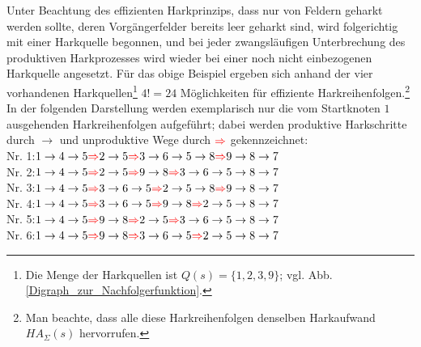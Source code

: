 \documentclass[fontsize=12pt,doubleside,openany,listof=totoc,listof=flat,listof=nochaptergap,numbers=noenddot]{scrbook}
\theoremstyle{style}
\begin{document}
\noindent Unter Beachtung des effizienten Harkprinzips, dass nur von Feldern geharkt werden sollte, deren Vorgängerfelder bereits leer geharkt sind, wird folgerichtig mit einer Harkquelle begonnen, und bei jeder zwangsläufigen Unterbrechung des produktiven Harkprozesses wird wieder bei einer noch nicht einbezogenen Harkquelle angesetzt. Für das obige Beispiel ergeben sich anhand der vier vorhandenen Harkquellen\footnote{Die Menge der Harkquellen ist $Q(s)=\{1,2,3,9\}$; vgl. Abb. \ref{Digraph_zur_Nachfolgerfunktion}.} $4!=24$ Möglichkeiten für effiziente Harkreihenfolgen.\footnote{Man beachte, dass alle diese Harkreihenfolgen denselben Harkaufwand $HA_{\Sigma}(s)$ hervorrufen.} In der folgenden Darstellung werden exemplarisch nur die vom Startknoten $1$ ausgehenden Harkreihenfolgen aufgeführt; dabei werden produktive Harkschritte durch $\rightarrow$ und unproduktive Wege durch $\textcolor{red}{\Rightarrow}$ gekennzeichnet:\\

\noindent 
\phantom \qquad Nr. 1:\quad $1\rightarrow4\rightarrow5\textcolor{red}{\Rightarrow}
2\rightarrow5\textcolor{red}{\Rightarrow}
3\rightarrow6\rightarrow5\rightarrow8\textcolor{red}{\Rightarrow}
9\rightarrow8\rightarrow 7$ \\
\phantom \qquad Nr. 2:\quad $1\rightarrow4\rightarrow5\textcolor{red}{\Rightarrow}
2\rightarrow5\textcolor{red}{\Rightarrow}
9\rightarrow8\textcolor{red}{\Rightarrow}
3\rightarrow6\rightarrow5\rightarrow8\rightarrow7$ \\
\phantom \qquad Nr. 3:\quad $1\rightarrow4\rightarrow5\textcolor{red}{\Rightarrow}
3\rightarrow6\rightarrow5\textcolor{red}{\Rightarrow}
2\rightarrow5\rightarrow8\textcolor{red}{\Rightarrow}
9\rightarrow8\rightarrow7$ \\
\phantom \qquad Nr. 4:\quad $1\rightarrow4\rightarrow5\textcolor{red}{\Rightarrow}
3\rightarrow6\rightarrow5\textcolor{red}{\Rightarrow}
9\rightarrow8\textcolor{red}{\Rightarrow}
2\rightarrow5\rightarrow8\rightarrow7$ \\
\phantom \qquad Nr. 5:\quad $1\rightarrow4\rightarrow5\textcolor{red}{\Rightarrow}
9\rightarrow8\textcolor{red}{\Rightarrow}
2\rightarrow5\textcolor{red}{\Rightarrow}
3\rightarrow6\rightarrow5\rightarrow8\rightarrow7$ \\
\phantom \qquad Nr. 6:\quad $1\rightarrow4\rightarrow5\textcolor{red}{\Rightarrow}
9\rightarrow8\textcolor{red}{\Rightarrow}
3\rightarrow6\rightarrow5\textcolor{red}{\Rightarrow}
2\rightarrow5\rightarrow8\rightarrow7$ \\
\end{document}
